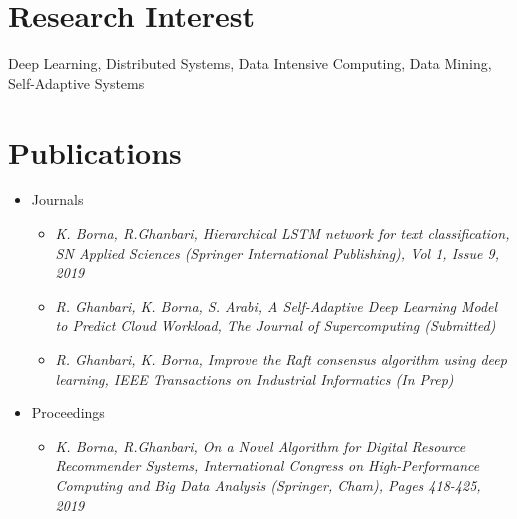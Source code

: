 \documentclass[letterpaper,11pt]{article}
\begin{document}
\section{Research Interest}
{\small {Deep Learning, Distributed Systems, Data Intensive Computing, Data Mining, Self-Adaptive Systems}\\


\section{Publications}
\begin{itemize}
	\item Journals
	\begin{itemize}
	\item {\textit {K. Borna, R.Ghanbari, Hierarchical LSTM network for text classification, SN Applied Sciences (Springer International Publishing), Vol 1, Issue 9, 2019}}\\
	\item {\textit {R. Ghanbari, K. Borna, S. Arabi, A Self-Adaptive Deep Learning Model to Predict Cloud Workload, The Journal of Supercomputing (Submitted)}}\\
	\item {\textit{R. Ghanbari, K. Borna, Improve the Raft consensus algorithm using deep learning, IEEE Transactions on Industrial Informatics (In Prep)}}\\
	\end{itemize}
	
	\item Proceedings
	\begin{itemize}
	\item {\textit {K. Borna, R.Ghanbari, On a Novel Algorithm for Digital Resource Recommender Systems, International Congress on High-Performance Computing and Big Data Analysis (Springer, Cham), Pages 418-425, 2019}}\\
	\end{itemize}
	\end{itemize}


}
\end{document}
